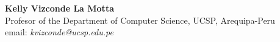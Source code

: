 \textbf{Kelly Vizconde La Motta}\\
Profesor  of the Department of Computer Science, UCSP, Arequipa-Peru\\
email: \textit{kvizconde@ucsp.edu.pe}
